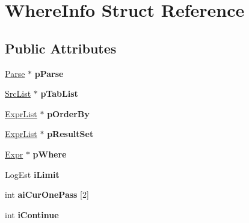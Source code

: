 \hypertarget{struct_where_info}{}\section{Where\+Info Struct Reference}
\label{struct_where_info}
\subsection*{Public Attributes}
\begin{DoxyCompactItemize}
\item 
\mbox{\label{struct_where_info_a26745055cd13360536fb4b074db358f9}} 
\mbox{\hyperlink{struct_parse}{Parse}} $\ast$ {\bfseries p\+Parse}
\item 
\mbox{\label{struct_where_info_a0f43432aeca75640c96a69f6a82aa138}} 
\mbox{\hyperlink{struct_src_list}{Src\+List}} $\ast$ {\bfseries p\+Tab\+List}
\item 
\mbox{\label{struct_where_info_a7d15fd39a32b8324e03b1c0b1db991a2}} 
\mbox{\hyperlink{struct_expr_list}{Expr\+List}} $\ast$ {\bfseries p\+Order\+By}
\item 
\mbox{\label{struct_where_info_ad480304ebeadcad7cb742dd8d8e11a0b}} 
\mbox{\hyperlink{struct_expr_list}{Expr\+List}} $\ast$ {\bfseries p\+Result\+Set}
\item 
\mbox{\label{struct_where_info_afae86f54ed8f79536437d1e71e348133}} 
\mbox{\hyperlink{struct_expr}{Expr}} $\ast$ {\bfseries p\+Where}
\item 
\mbox{\label{struct_where_info_a82f5ecf90452501ef3319b061723002d}} 
Log\+Est {\bfseries i\+Limit}
\item 
\mbox{\label{struct_where_info_a77e2c29eafad2f964cb36245f38178eb}} 
int {\bfseries ai\+Cur\+One\+Pass} \mbox{[}2\mbox{]}
\item 
\mbox{\label{struct_where_info_a5b8eb73a6a5bba7ef126b9de13ee8537}} 
int {\bfseries i\+Continue}
\item 
\mbox{\label{struct_where_info_a338ac73b84c81db455ad7db56b5e4a06}} 

\end{DoxyCompactItemize}

